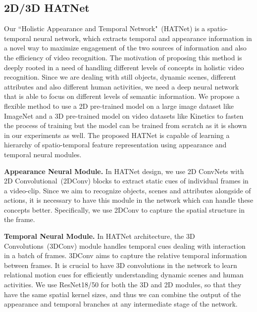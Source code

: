 \documentclass[runningheads]{llncs}
\begin{document}
\subsection{2D/3D HATNet}
Our ``Holistic Appearance and Temporal Network"~(HATNet) is a spatio-temporal neural network, which extracts temporal and appearance information in a novel way to maximize engagement of the two sources of information and also the efficiency of video recognition. The motivation of proposing this method is deeply rooted in a need of handling different levels of concepts in holistic video recognition. Since we are dealing with still objects, dynamic scenes, different attributes and also different human activities, we need a deep neural network that is able to focus on different levels of semantic information. We propose a flexible method to use a 2D pre-trained model on a large image dataset like ImageNet and a 3D pre-trained model on video datasets like Kinetics to fasten the process of training but the model can be trained from scratch as it is shown in our experiments as well. The proposed HATNet is capable of learning a hierarchy of spatio-temporal feature representation using appearance and temporal neural modules.

\textbf{Appearance Neural Module.} In HATNet design, 
we use 2D ConvNets with  2D Convolutional~(2DConv)  blocks to extract static cues of individual frames in a video-clip. Since we aim to recognize objects, scenes and attributes alongside of actions, it is necessary to have this module in the network which can handle these concepts better. Specifically, we use 2DConv to capture the spatial structure in the frame.

\textbf{Temporal Neural Module.} In HATNet architecture, the 3D Convolutions~(3DConv) module handles temporal cues dealing with interaction in a batch of frames. 3DConv aims to capture the relative temporal information between frames. It is crucial to have 3D convolutions in the network to learn relational motion cues for efficiently understanding dynamic scenes and human activities. We use ResNet18/50 for both the 3D and 2D modules,
so that they have the same spatial kernel sizes, and thus we can combine the output of the appearance and temporal branches at any intermediate stage of the network. 
\end{document}
